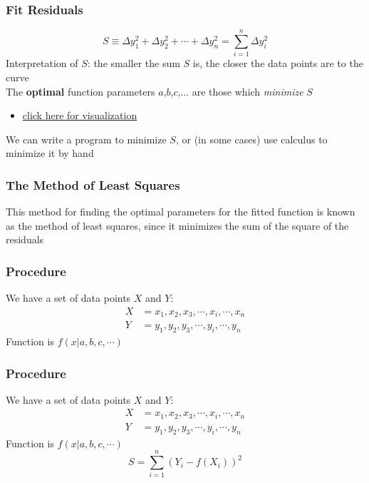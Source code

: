 \documentclass{beamer}
\begin{document}
	\begin{frame}
			\frametitle{Fit Residuals}
	\begin{equation*}
		S\equiv\Delta y_1 ^2+ \Delta y_2^2+ \cdots + \Delta y_n^2 = \sum_{i=1}^{n}\Delta y_i^2
	\end{equation*}
	Interpretation of $S$: the smaller the sum $S$ is, the closer the data points are to the curve\\
	The \textbf{optimal} function parameters $a$,$b$,$c$,... are those which \textit{minimize} $S$
	\begin{itemize}
		\item \href{https://phet.colorado.edu/sims/html/least-squares-regression/latest/least-squares-regression_en.html}{click here for visualization}
	\end{itemize}
	We can write a program to minimize $S$, or (in some cases) use calculus to minimize it by hand
	\end{frame}

\begin{frame}
	\frametitle{The Method of Least Squares}
	This method for finding the optimal parameters for the fitted function is known as the method of least squares, since it minimizes the sum of the square of the residuals
\end{frame}

\begin{frame}
	\frametitle{Procedure}
			We have a set of data points $X$ and $Y$:
	\begin{align*}
		X &= x_1, x_2, x_3, \cdots, x_i, \cdots, x_n\\
		Y &= y_1, y_2, y_3, \cdots, y_i, \cdots, y_n
	\end{align*}
	Function is $f(x|{a, b, c, \cdots})$
\end{frame}

\begin{frame}
	\frametitle{Procedure}
	We have a set of data points $X$ and $Y$:
	\begin{align*}
		X &= x_1, x_2, x_3, \cdots, x_i, \cdots, x_n\\
		Y &= y_1, y_2, y_3, \cdots, y_i, \cdots, y_n
	\end{align*}
	Function is $f(x|{a, b, c, \cdots})$\\
	\begin{equation*}
		S = \sum_{i=1}^{n}\left(Y_i-f(X_i)\right)^2
	\end{equation*}
\end{frame}
\end{document}

